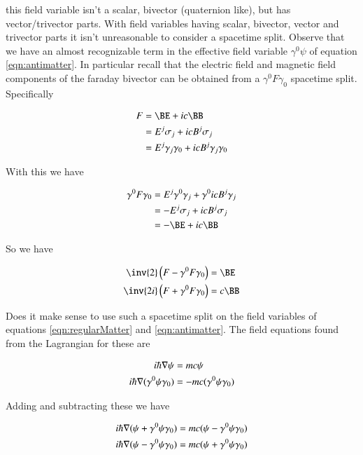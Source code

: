 \documentclass{article}
\begin{document}
this field variable isn't a scalar, bivector (quaternion like), but has vector/trivector parts.  With field variables having scalar, bivector, vector and trivector parts it isn't unreasonable to consider a spacetime split.  Observe that we have an almost recognizable term in the effective field variable $\gamma^0 \psi$ of
equation \ref{eqn:antimatter}.  In particular recall that the electric field and magnetic field components of the faraday bivector can be obtained from a 
$\gamma^0 F \gamma_0$ spacetime split.  Specifically

\begin{align*}
F 
&= \BE + i c \BB \\
&= E^j \sigma_j + i c B^j \sigma_j \\
&= E^j \gamma_j \gamma_0 + i c B^j \gamma_j \gamma_0 \\
\end{align*}

With this we have

\begin{align*}
\gamma^0 F \gamma_0
&= E^j \gamma^0 \gamma_j + \gamma^0 i c B^j \gamma_j \\
&= -E^j \sigma_j + i c B^j \sigma_j \\
&= -\BE + i c \BB
\end{align*}

So we have

\begin{align*}
\inv{2} \left(F - \gamma^0 F \gamma_0 \right) &= \BE \\
\inv{2i} \left(F + \gamma^0 F \gamma_0 \right) &= c \BB
\end{align*}

Does it make sense to use such a spacetime split on the field variables of equations \ref{eqn:regularMatter} and \ref{eqn:antimatter}.  The field equations
found from the Lagrangian for these are 

\begin{align*}
i \hbar \nabla \psi &= m c \psi \\
i \hbar \nabla (\gamma^0 \psi \gamma_0) &= -m c (\gamma^0 \psi \gamma_0)
\end{align*}

Adding and subtracting these we have

\begin{align*}
i \hbar \nabla (\psi + \gamma^0 \psi \gamma_0) &= m c (\psi -\gamma^0 \psi \gamma_0) \\
i \hbar \nabla (\psi - \gamma^0 \psi \gamma_0) &= m c (\psi +\gamma^0 \psi \gamma_0)
\end{align*}
\end{document}
